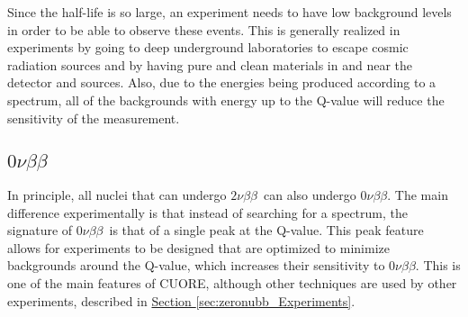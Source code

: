 \documentclass[12pt,a4paper]{article}
\newcommand{\zeronubb}{$0\nu \beta \beta$}
\newcommand{\twonubb}{$2\nu \beta \beta$}
\begin{document}
Since the half-life is so large, an experiment needs to have low background levels in order to be able to observe these events. This is generally realized in experiments by going to deep underground laboratories to escape cosmic radiation sources and by having pure and clean materials in and near the detector and sources. Also, due to the energies being produced according to a spectrum, all of the backgrounds with energy up to the Q-value will reduce the sensitivity of the measurement.

\begin{comment}
\begin{center}
\begin{tabular}{|c|c|c|}
\hline 
Isotope & Half-life, $10^{21}$ years & Experiment \\ \hline 
$^{48}\textrm{Ca}$ & $0.044^{+0.005}_{-0.004} \pm 0.004$ & Nemo-3 \\ \hline
$^{78}\textrm{Ge}$ & $1.84^{+0.09~+0.11}_{-0.08~-0.06}$ & GERDA (2013) \\ \hline
$^{82}\textrm{Se}$ & $0.096 \pm 0.003 \pm 0.010$ & NEMO-3 \\ \hline
$^{96}\textrm{Zr}$ & $0.0235 \pm 0.0014 \pm 0.0016$ & NEMO-3 \\ \hline
$^{100}\textrm{Mo}$ & $0.00711 \pm 0.00002 \pm 0.00054$ & NEMO-3 \\ \hline
$^{116}\textrm{Cd}$ & $0.028 \pm 0.001 \pm 0.003$ & NEMO-3 \\ \hline
$^{130}\textrm{Te}$ & $0.7 \pm 0.09\pm 0.11$ & NEMO-3 \\ \hline
$^{136}\textrm{Xe}$ & $2.165 \pm 0.016 \pm 0.059$ & EXO-200 \\ \hline
$^{150}\textrm{Nd}$ & $0.00911^{+0.00025}_{-0.00022}\pm 0.00063$ & NEMO-3 \\ \hline
\end{tabular} 
\end{center}
\end{comment}

\subsection{\zeronubb}
In principle, all nuclei that can undergo \twonubb~can also undergo \zeronubb. The main difference experimentally is that instead of searching for a spectrum, the signature of \zeronubb~is that of a single peak at the Q-value. This peak feature allows for experiments to be designed that are optimized to minimize backgrounds around the Q-value, which increases their sensitivity to \zeronubb. This is one of the main features of CUORE, although other techniques are used by other experiments, described in \hyperref[sec:zeronubb_Experiments]{Section \ref*{sec:zeronubb_Experiments}}.
\end{document}

